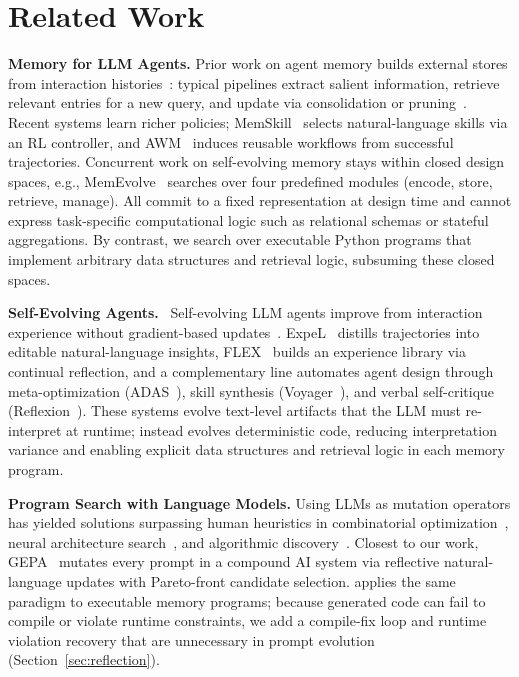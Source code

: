 
\section{Related Work}

\noindent\textbf{Memory for LLM Agents.}
Prior work on agent memory builds external stores from interaction histories~\citep{zhang2024survey_memory}: typical pipelines extract salient information, retrieve relevant entries for a new query, and update via consolidation or pruning~\citep{park2023generative,zhong2024memorybank,wang2024augmenting}.
Recent systems learn richer policies; MemSkill~\citep{memskill} selects natural-language skills via an RL controller, and AWM~\citep{wang2024awm} induces reusable workflows from successful trajectories.
Concurrent work on self-evolving memory stays within closed design spaces, e.g., MemEvolve~\citep{memevolve} searches over four predefined modules (encode, store, retrieve, manage).
All commit to a fixed representation at design time and cannot express task-specific computational logic such as relational schemas or stateful aggregations.
By contrast, we search over executable Python programs that implement arbitrary data structures and retrieval logic, subsuming these closed spaces.

\noindent\textbf{Self-Evolving Agents.}~
Self-evolving LLM agents improve from interaction experience without gradient-based updates~\citep{gao2025survey_selfevolving}.
ExpeL~\citep{zhao2024expel} distills trajectories into editable natural-language insights, FLEX~\citep{cai2025flex} builds an experience library via continual reflection, and a complementary line automates agent design through meta-optimization (ADAS~\citep{hu2024adas}), skill synthesis (Voyager~\citep{wang2023voyager}), and verbal self-critique (Reflexion~\citep{shinn2023reflexion}).
These systems evolve text-level artifacts that the LLM must re-interpret at runtime; \sysname{} instead evolves deterministic code, reducing interpretation variance and enabling explicit data structures and retrieval logic in each memory program.

\noindent\textbf{Program Search with Language Models. }
Using LLMs as mutation operators has yielded solutions surpassing human heuristics in combinatorial optimization~\citep{romera2024funsearch}, neural architecture search~\citep{chen2023evoprompting}, and algorithmic discovery~\citep{deepmind2025alphaevolve}.
Closest to our work, GEPA~\citep{gepa} mutates every prompt in a compound AI system via reflective natural-language updates with Pareto-front candidate selection.
\sysname{} applies the same paradigm to executable memory programs; because generated code can fail to compile or violate runtime constraints, we add a compile-fix loop and runtime violation recovery that are unnecessary in prompt evolution (Section~\ref{sec:reflection}).
